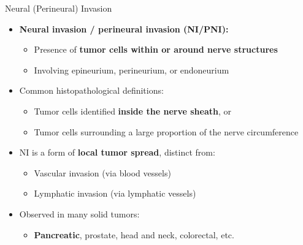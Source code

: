 \documentclass[10pt]{beamer}
\theoremstyle{plain}
\begin{document}
\begin{frame}{Neural (Perineural) Invasion}
  \begin{itemize}
    \item \textbf{Neural invasion / perineural invasion (NI/PNI):}
      \begin{itemize}
        \item Presence of \textbf{tumor cells within or around nerve structures}
        \item Involving epineurium, perineurium, or endoneurium
      \end{itemize}
    \item Common histopathological definitions:
      \begin{itemize}
        \item Tumor cells identified \textbf{inside the nerve sheath}, or
        \item Tumor cells surrounding a large proportion of the nerve circumference
      \end{itemize}
    \item NI is a form of \textbf{local tumor spread}, distinct from:
      \begin{itemize}
        \item Vascular invasion (via blood vessels)
        \item Lymphatic invasion (via lymphatic vessels)
      \end{itemize}
    \item Observed in many solid tumors:
      \begin{itemize}
        \item \textbf{Pancreatic}, prostate, head and neck, colorectal, etc.
      \end{itemize}
  \end{itemize}
\end{frame}
\end{document}

